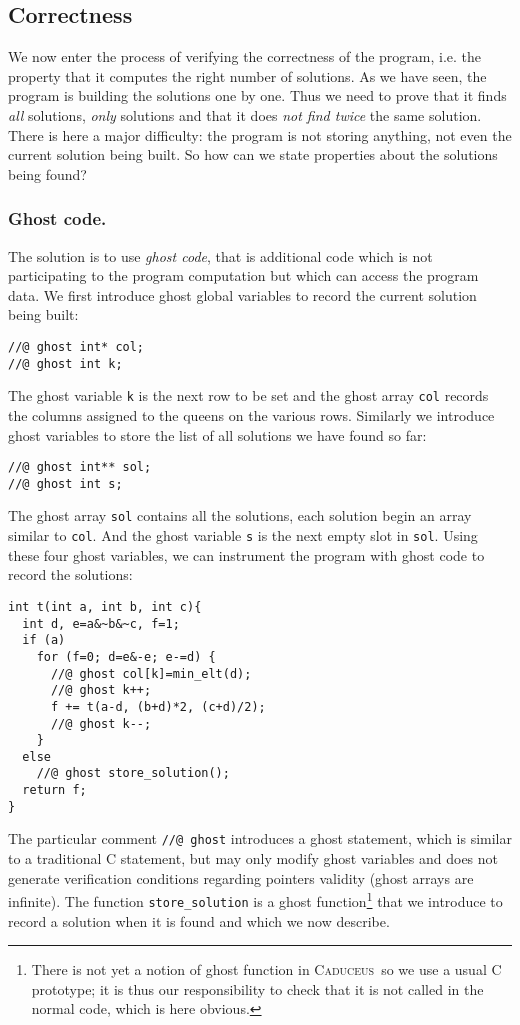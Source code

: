 \documentclass[a4paper]{llncs}
\newcommand{\caduceus}{\textsc{Caduceus}}
\begin{document}
\subsection{Correctness}\label{correctness}

We now enter the process of verifying the correctness of the program,
i.e. the property that it computes the right number of solutions. As
we have seen, the program is building the solutions one by one. Thus
we need to prove that it finds \emph{all} solutions, \emph{only}
solutions and that it does \emph{not find twice} the same
solution. There is here a major difficulty: the program is not storing
anything, not even the current solution being built. So how can we
state properties about the solutions being found? 

\subsubsection{Ghost code.} The solution is to
use \emph{ghost code}, that is additional code which is not
participating to the program computation but which can access the
program data. We first introduce ghost global variables to record the 
current solution being built:
\begin{verbatim}
//@ ghost int* col;
//@ ghost int k;
\end{verbatim}
The ghost variable \texttt{k} is the next row to be set and the ghost
array \texttt{col} records the columns assigned to the queens on the
various rows. Similarly we introduce ghost variables to store the list of
all solutions we have found so far:
\begin{verbatim}
//@ ghost int** sol;
//@ ghost int s;
\end{verbatim}
The ghost array \texttt{sol} contains all the solutions, each
solution begin an array similar to \texttt{col}.
And the ghost variable \texttt{s} is the next empty slot in \texttt{sol}. 
Using these four ghost variables, we can instrument the program with
ghost code to record the solutions:
\begin{verbatim}
int t(int a, int b, int c){
  int d, e=a&~b&~c, f=1;
  if (a)
    for (f=0; d=e&-e; e-=d) {
      //@ ghost col[k]=min_elt(d);
      //@ ghost k++;
      f += t(a-d, (b+d)*2, (c+d)/2);
      //@ ghost k--;
    }
  else 
    //@ ghost store_solution();
  return f;
}
\end{verbatim}
The particular comment \verb!//@ ghost! introduces a ghost statement,
which is similar to a traditional C statement, but may only modify
ghost variables and does not generate verification conditions
regarding pointers validity (ghost arrays are infinite).
The function \texttt{store\_solution} is a ghost
function\footnote{There is not yet a notion of ghost function in
  \caduceus\ so we use a usual C prototype; it is thus our
  responsibility to check that it is not called in the normal code,
  which is here obvious.} that we introduce to record a solution when
it is found and which we now describe.
\end{document}
